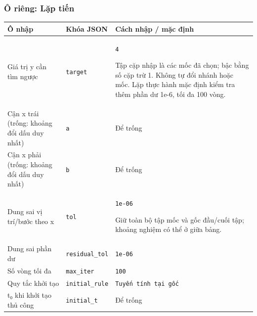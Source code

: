 \subsubsection*{Ô riêng: Lặp tiến}
\begin{center}\small\begin{tabular}{@{}p{.32\linewidth}p{.17\linewidth}p{.43\linewidth}@{}}\toprule
Ô nhập & Khóa JSON & Cách nhập / mặc định\\\midrule
Giá trị y cần tìm ngược & \texttt{target} & \texttt{4}
\par Tập cặp nhập là các mốc đã chọn;\allowbreak{} bậc bằng số cặp trừ 1. Không tự đổi nhánh hoặc mốc. Lặp thực hành mặc định kiểm tra thêm phần dư 1e-6,\allowbreak{} tối đa 100 vòng.\\[3pt]
Cận x trái (trống: khoảng đổi dấu duy nhất) & \texttt{a} & Để trống\\[3pt]
Cận x phải (trống: khoảng đổi dấu duy nhất) & \texttt{b} & Để trống\\[3pt]
Dung sai vị trí/\allowbreak{}bước theo x & \texttt{tol} & \texttt{1e-06}
\par Giữ toàn bộ tập mốc và gốc đầu/\allowbreak{}cuối tập;\allowbreak{} khoảng nghiệm có thể ở giữa bảng.\\[3pt]
Dung sai phần dư & \texttt{residual\_tol} & \texttt{1e-06}\\[3pt]
Số vòng tối đa & \texttt{max\_iter} & \texttt{100}\\[3pt]
Quy tắc khởi tạo & \texttt{initial\_rule} & \texttt{Tuyến tính tại gốc}\\[3pt]
t₀ khi khởi tạo thủ công & \texttt{initial\_t} & Để trống\\[3pt]
\bottomrule\end{tabular}\end{center}
